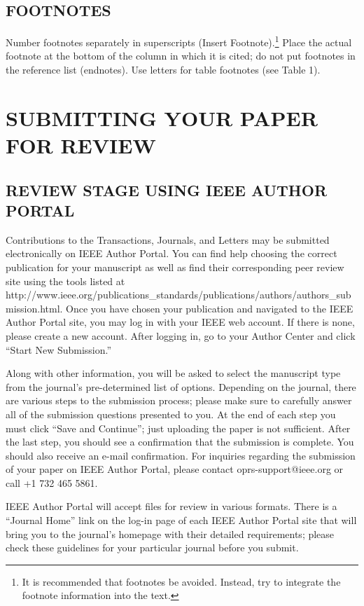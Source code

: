 \documentclass{ieeetj}
\begin{document}
\subsection{FOOTNOTES}
Number footnotes separately in superscripts (Insert\textbar
Footnote).\footnote{It is recommended that footnotes be avoided. Instead,
try to integrate the footnote information into the text.} Place the actual
footnote at the bottom of the column in which it is cited; do not put
footnotes in the reference list (endnotes). Use letters for table footnotes
(see Table 1).

\section{SUBMITTING YOUR PAPER FOR REVIEW}

\subsection{REVIEW STAGE USING IEEE AUTHOR PORTAL}

Contributions to the Transactions, Journals, and Letters may be submitted electronically on IEEE Author Portal. You can find help choosing the correct publication for your manuscript as well as find their corresponding peer review site using the tools listed at http://\discretionary{}{}{}www.ieee.org/\discretionary{}{}{}publications\_standards/\discretionary{}{}{}publications/\discretionary{}{}{}authors/\discretionary{}{}{}authors\_submission.html. Once you have chosen your publication and navigated to the IEEE Author Portal site, you may log in with your IEEE web account. If there is none, please create a new account. After logging in, go to your Author Center and click ``Start New Submission.''

Along with other information, you will be asked to select the manuscript type from the journal's pre-determined list of options. Depending on the journal, there are various steps to the submission process; please make sure to carefully answer all of the submission questions presented to you. At the end of each step you must click ``Save and Continue''; just uploading the paper is not sufficient. After the last step, you should see a confirmation that the submission is complete. You should also receive an e-mail confirmation. For inquiries regarding the submission of your paper on IEEE Author Portal, please contact oprs-support@ieee.org or call +1 732 465 5861.

IEEE Author Portal will accept files for review in various formats. There is a ``Journal Home'' link on the log-in page of each IEEE Author Portal site that will bring you to the journal's homepage with their detailed requirements; please check these guidelines for your particular journal before you submit.
\end{document}
